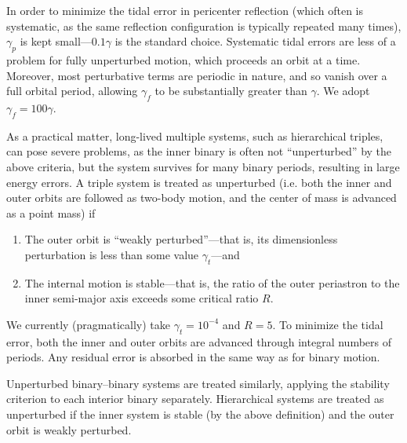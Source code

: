 \documentclass{article}
\begin{document}
In order to minimize the tidal error in pericenter reflection (which
often is systematic, as the same reflection configuration is typically
repeated many times), $\gamma_p$ is kept small---$0.1\gamma$ is the
standard choice.  Systematic tidal errors are less of a problem for
fully unperturbed motion, which proceeds an orbit at a time.
Moreover, most perturbative terms are periodic in nature, and so
vanish over a full orbital period, allowing $\gamma_f$ to be
substantially greater than $\gamma$.  We adopt $\gamma_f = 100
\gamma$.

As a practical matter, long-lived multiple systems, such as
hierarchical triples, can pose severe problems, as the inner binary is
often not ``unperturbed'' by the above criteria, but the system
survives for many binary periods, resulting in large energy errors.  A
triple system is treated as unperturbed (i.e. both the inner and outer
orbits are followed as two-body motion, and the center of mass is
advanced as a point mass) if

\begin{enumerate}

\item	The outer orbit is ``weakly perturbed''---that is, its
	dimensionless perturbation is less than some value
	$\gamma_t$---and

\item	The internal motion is stable---that is, the ratio of the outer
	periastron to the inner semi-major axis exceeds some critical
	ratio $R$.

\end{enumerate}

We currently (pragmatically) take $\gamma_t = 10^{-4}$ and $R = 5$.
To minimize the tidal error, both the inner and outer orbits are
advanced through integral numbers of periods.  Any residual error is
absorbed in the same way as for binary motion.

Unperturbed binary--binary systems are treated similarly, applying the
stability criterion to each interior binary separately.  Hierarchical
systems are treated as unperturbed if the inner system is stable (by
the above definition) and the outer orbit is weakly perturbed.
\end{document}
